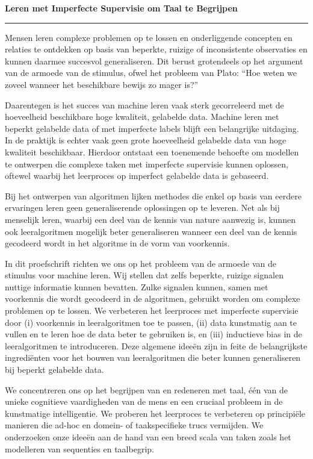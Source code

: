 \samenvatting
\vspace{-30pt}
\textbf{Leren met Imperfecte Supervisie om Taal te Begrijpen}
\vspace{-10pt}\par\noindent\rule{\textwidth}{0.4pt}

Mensen leren complexe problemen op te lossen en onderliggende concepten en relaties te ontdekken op basis van beperkte, ruizige of inconsistente observaties en kunnen daarmee succesvol generaliseren.
Dit berust grotendeels op het argument van de armoede van de stimulus, ofwel het probleem van Plato: ``Hoe weten we zoveel wanneer het beschikbare bewijs zo mager is?''

Daarentegen is het succes van machine leren vaak sterk gecorreleerd met de hoeveelheid beschikbare hoge kwaliteit, gelabelde data. Machine leren met beperkt gelabelde data of met imperfecte labels blijft een belangrijke uitdaging.
In de praktijk is echter vaak geen grote hoeveelheid gelabelde data van hoge kwaliteit beschikbaar.
Hierdoor ontstaat een toenemende behoefte om modellen te ontwerpen die complexe taken met imperfecte supervisie kunnen oplossen, oftewel waarbij het leerproces op imperfect gelabelde data is gebaseerd.

Bij het ontwerpen van algoritmen lijken methodes die enkel op basis van eerdere ervaringen leren geen generaliserende oplossingen op te leveren.
Net als bij menselijk leren, waarbij een deel van de kennis van nature aanwezig is, kunnen ook leeralgoritmen mogelijk beter generaliseren wanneer een deel van de kennis gecodeerd wordt in het algoritme in de vorm van voorkennis.

In dit proefschrift richten we ons op het probleem van de armoede van de stimulus voor machine leren.
Wij stellen dat zelfs beperkte, ruizige signalen nuttige informatie kunnen bevatten.
Zulke signalen kunnen, samen met voorkennis die wordt gecodeerd in de algoritmen, gebruikt worden om complexe problemen op te lossen.
We verbeteren het leerproces met imperfecte supervisie door (i) voorkennis in leeralgoritmen toe te passen, (ii) data kunstmatig aan te vullen en te leren hoe de data beter te gebruiken is, en (iii) inductieve bias in de leeralgoritmen te introduceren.
Deze algemene ideeën zijn in feite de belangrijkste ingrediënten voor het bouwen van leeralgoritmen die beter kunnen generaliseren bij beperkt gelabelde data.

We concentreren ons op het begrijpen van en redeneren met taal, \'e\'en van de unieke cognitieve vaardigheden van de mens en een cruciaal probleem in de kunstmatige intelligentie.
We proberen het leerproces te verbeteren op principiële manieren die ad-hoc en domein- of taakspecifieke trucs vermijden.
We onderzoeken onze ideeën aan de hand van een breed scala van taken zoals het modelleren van sequenties en taalbegrip.
